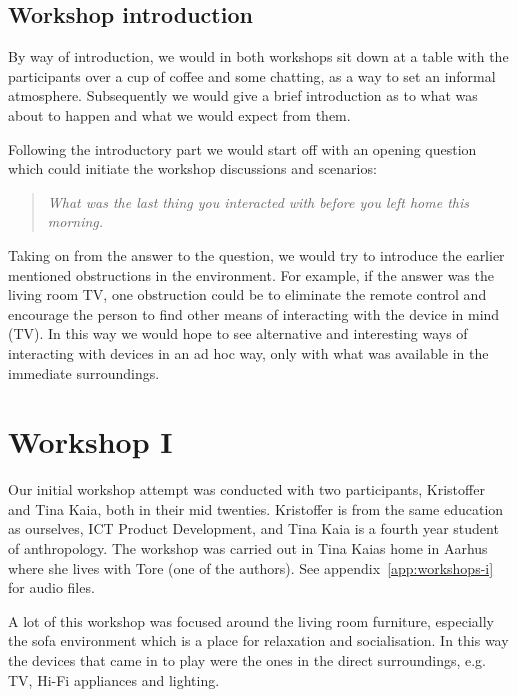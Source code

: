 \subsection{Workshop introduction}
\label{ch:workshops:approach:introduction}
By way of introduction, we would in both workshops sit down at a table with the participants over a cup of coffee and some chatting, as a way to set an informal atmosphere.
Subsequently we would give a brief introduction as to what was about to happen and what we would expect from them.

Following the introductory part we would start off with an opening question which could initiate the workshop discussions and scenarios:

\begin{quotation}
  \emph{What was the last thing you interacted with before you left home this morning.}
\end{quotation}

Taking on from the answer to the question, we would try to introduce the earlier mentioned obstructions in the environment.
For example, if the answer was the living room TV, one obstruction could be to eliminate the remote control and encourage the person to find other means of interacting with the device in mind (TV).
In this way we would hope to see alternative and interesting ways of interacting with devices in an ad hoc way, only with what was available in the immediate surroundings.

\section{Workshop I}
\label{ch:workshops:workshop-i}
Our initial workshop attempt was conducted with two participants, Kristoffer and Tina Kaia, both in their mid twenties.
Kristoffer is from the same education as ourselves, ICT Product Development, and Tina Kaia is a fourth year student of anthropology.
The workshop was carried out in Tina Kaias home in Aarhus where she lives with Tore (one of the authors).
See appendix~\ref{app:workshops-i} for audio files.

A lot of this workshop was focused around the living room furniture, especially the sofa environment which is a place for relaxation and socialisation.
In this way the devices that came in to play were the ones in the direct surroundings, e.g. TV, Hi-Fi appliances and lighting.

